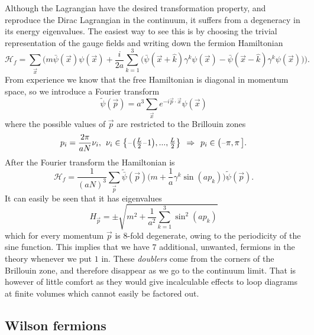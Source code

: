 Although the Lagrangian  have the desired
transformation property, and reproduce the Dirac Lagrangian in the continuum, it
suffers from a degeneracy in its energy eigenvalues. The easiest way to see this
is by choosing the trivial representation of the gauge fields and writing down
the fermion Hamiltonian
%
\begin{equation}
  \mathcal{H}_f = \sum_{\vec{x}} \bigg(
    m \bar{\psi}(\vec{x}) \psi(\vec{x}) + \frac{i}{2a} \sum_{k=1}^3 \Big(
      \bar{\psi}(\vec{x}+\hat{k})\gamma^k\psi(\vec{x}) 
      -\bar{\psi}(\vec{x}-\hat{k})\gamma^k\psi(\vec{x})\Big)\bigg).
\end{equation}
%
From experience we know that the free Hamiltonian is diagonal in momentum space,
so we introduce a Fourier transform
%
\begin{equation}
  \tilde{\psi}(\vec{p}) = a^3 \sum_{\vec{x}} e^{-i \vec{p}\cdot \vec{x}}
    \psi(\vec{x})
\end{equation}
%
where the possible values of $\vec{p}$ are restricted to the Brillouin zones
%
\begin{equation}
  p_i = \frac{2\pi}{a N} \nu_i, \hskip1ex \nu_i \in
    \big\{\textstyle\minus{}\big(\frac{L}{2}\minus{}1\big), ...,
    \frac{L}{2} \big\} \hskip1ex\Rightarrow\hskip1ex p_i \in \big(\minus\pi, \pi\,\big].
\end{equation}
%
After the Fourier transform the Hamiltonian is
%
\begin{equation}
  \mathcal{H}_f = \frac{1}{(aN)^3}\sum_{\vec{p}} \tilde{\bar{\psi}}(\vec{p})
    \Big( m + \frac{1}{a} \gamma^k \sin (a p_k) \Big) \tilde{\psi}(\vec{p}).
\end{equation}
%
It can easily be seen that it has eigenvalues
%
\begin{equation}
  H_{\vec{p}} = \pm \sqrt{m^2 + \frac{1}{a^2} \sum_{k=1}^3 \sin^2 (a p_k)}
\end{equation}
%
which for every momentum $\vec{p}$ is $8$-fold degenerate, owing to the
periodicity of the sine function. This implies that we have $7$ additional,
unwanted, fermions in the theory whenever we put $1$ in. These \emph{doublers}
come from the corners of the Brillouin zone, and therefore disappear as we go
to the continuum limit. That is however of little comfort as they would give
incalculable effects to loop diagrams at finite volumes which cannot easily be
factored out.

\subsection{Wilson fermions}

